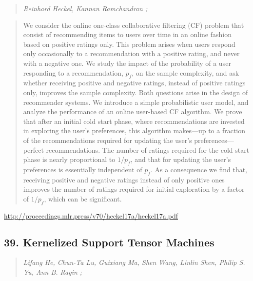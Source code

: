 \documentclass{article}
\begin{document}
\begin{quote}
\footnotesize{\textit{Reinhard Heckel, Kannan Ramchandran ;}}
\end{quote}

\begin{quote}
    We consider the online one-class collaborative filtering (CF) problem that consist of recommending items to users over time in an online fashion based on positive ratings only. This problem arises when users respond only occasionally to a recommendation with a positive rating, and never with a negative one. We study the impact of the probability of a user responding to a recommendation, $p_f$, on the sample complexity, and ask whether receiving positive and negative ratings, instead of positive ratings only, improves the sample complexity. Both questions arise in the design of recommender systems. We introduce a simple probabilistic user model, and analyze the performance of an online user-based CF algorithm. We prove that after an initial cold start phase, where recommendations are invested in exploring the user’s preferences, this algorithm makes—up to a fraction of the recommendations required for updating the user’s preferences—perfect recommendations. The number of ratings required for the cold start phase is nearly proportional to $1/p_f$, and that for updating the user’s preferences is essentially independent of $p_f$. As a consequence we find that, receiving positive and negative ratings instead of only positive ones improves the number of ratings required for initial exploration by a factor of $1/p_f$, which can be significant.  \end{quote}

\href{http://proceedings.mlr.press/v70/heckel17a/heckel17a.pdf}{http://proceedings.mlr.press/v70/heckel17a/heckel17a.pdf}

\subsection{39. Kernelized Support Tensor Machines}

\begin{quote}
\footnotesize{\textit{Lifang He, Chun-Ta Lu, Guixiang Ma, Shen Wang, Linlin Shen, Philip S. Yu, Ann B. Ragin ;}}
\end{quote}
\end{document}
